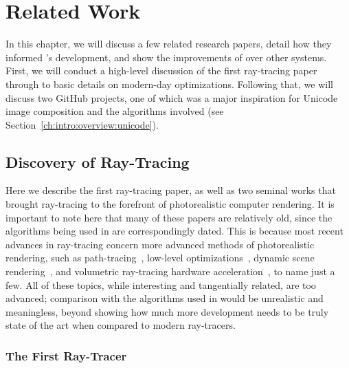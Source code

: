 %
%
\chapter{Related Work}
\label{ch:relatedwork}

In this chapter, we will discuss a few related research papers, detail how they informed \name{}'s development, and show the improvements of \name{} over other systems.
First, we will conduct a high-level discussion of the first ray-tracing paper through to basic details on modern-day optimizations.
Following that, we will discuss two GitHub projects, one of which was a major inspiration for Unicode image composition and the algorithms involved (see Section~\ref{ch:intro:overview:unicode}).

\section{Discovery of Ray-Tracing}
\label{ch:relatedwork:discovery}

Here we describe the first ray-tracing paper, as well as two seminal works that brought ray-tracing to the forefront of photorealistic computer rendering.
It is important to note here that many of these papers are relatively old, since the algorithms being used in \name{} are correspondingly dated.
This is because most recent advances in ray-tracing concern more advanced methods of photorealistic rendering, such as path-tracing~\cite{lafortune1993bi}, low-level optimizations~\cite{wald2001interactive}, dynamic scene rendering~\cite{wald2007ray}, and volumetric ray-tracing hardware acceleration~\cite{kruger2003acceleration}, to name just a few.
All of these topics, while interesting and tangentially related, are too advanced; comparison with the algorithms used in \name{} would be unrealistic and meaningless, beyond showing how much more development \name{} needs to be truly state of the art when compared to modern ray-tracers.

\subsection{The First Ray-Tracer}
\label{ch:relatedwork:discovery:first}

